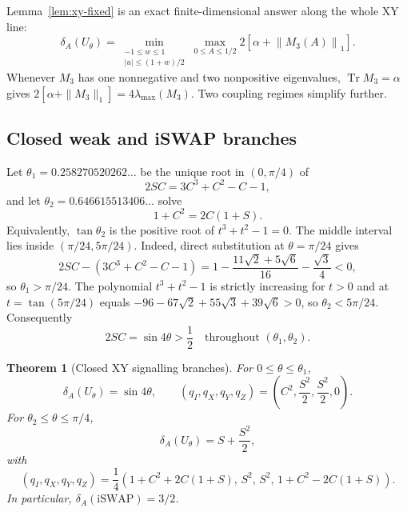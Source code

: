 \documentclass[11pt,a4paper]{article}
\newtheorem{theorem}{Theorem}
\theoremstyle{remark}
\newcommand{\Tr}{\operatorname{Tr}}
\newcommand{\tracenorm}[1]{\left\lVert #1\right\rVert_{1}}
\begin{document}
Lemma~\ref{lem:xy-fixed} is an exact finite-dimensional answer along the whole
XY line:
\begin{equation}
 \delta_A(U_\theta)=
 \min_{\substack{-1\leq w\leq1\\|u|\leq(1+w)/2}}
 \max_{0\leq A\leq1/2}
 2\left[\alpha+\tracenorm{M_3(A)}\right].
 \label{eq:xy-minmax}
\end{equation}
Whenever $M_3$ has one nonnegative and two nonpositive eigenvalues,
$\Tr M_3=\alpha$ gives
$2[\alpha+\|M_3\|_1]=4\lambda_{\max}(M_3)$.
Two coupling regimes simplify further.

\subsection{Closed weak and iSWAP branches}

Let $\theta_1=0.258270520262\ldots$ be the unique root in
$(0,\pi/4)$ of
\begin{equation}
 2SC=3C^3+C^2-C-1,
 \label{eq:xy-first-threshold}
\end{equation}
and let $\theta_2=0.646615513406\ldots$ solve
\begin{equation}
 1+C^2=2C(1+S).
 \label{eq:xy-second-threshold}
\end{equation}
Equivalently, $\tan\theta_2$ is the positive root of $t^3+t^2-1=0$.
The middle interval lies inside $(\pi/24,5\pi/24)$.  Indeed, direct
substitution at $\theta=\pi/24$ gives
\[
 2SC-(3C^3+C^2-C-1)
 =1-\frac{11\sqrt2+5\sqrt6}{16}-\frac{\sqrt3}{4}<0,
\]
so $\theta_1>\pi/24$.  The polynomial $t^3+t^2-1$ is strictly increasing for
$t>0$ and at $t=\tan(5\pi/24)$ equals
$-96-67\sqrt2+55\sqrt3+39\sqrt6>0$, so
$\theta_2<5\pi/24$.  Consequently
\begin{equation}
 2SC=\sin4\theta>\frac12
 \quad\text{throughout }(\theta_1,\theta_2).
 \label{eq:xy-middle-lower-window}
\end{equation}

\begin{theorem}[Closed XY signalling branches]
\label{thm:xy}
For $0\leq\theta\leq\theta_1$,
\begin{equation}
 \delta_A(U_\theta)=\sin4\theta,
 \qquad (q_I,q_X,q_Y,q_Z)
 =\left(C^2,\frac{S^2}{2},\frac{S^2}{2},0\right).
 \label{eq:xy-weak}
\end{equation}
For $\theta_2\leq\theta\leq\pi/4$,
\begin{equation}
 \delta_A(U_\theta)=S+\frac{S^2}{2},
 \label{eq:xy-strong}
\end{equation}
with
\begin{equation}
 (q_I,q_X,q_Y,q_Z)=\frac14
 \left(1+C^2+2C(1+S),\,S^2,\,S^2,\,
       1+C^2-2C(1+S)\right).
 \label{eq:xy-strong-channel}
\end{equation}
In particular, $\delta_A(\mathrm{iSWAP})=3/2$.
\end{theorem}
\end{document}
